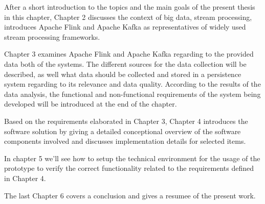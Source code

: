 After a short introduction to the topics and the main goals of the present thesis in this
chapter, Chapter 2 discusses the context of big data, stream processing, introduces Apache Flink and
Apache Kafka as representatives of widely used stream processing frameworks.

Chapter 3 examines Apache Flink and Apache Kafka regarding to the provided data both of the systems.
The different sources for the data collection will be described, as well what data should be collected
and stored in a persistence system regarding to its relevance and data quality. According to the results
of the data analysis, the functional and non-functional requirements of the system being developed will
be introduced at the end of the chapter.

Based on the requirements elaborated in Chapter 3, Chapter 4 introduces the software solution by
giving a detailed conceptional overview of the software components involved and discusses implementation
details for selected items.

In chapter 5 we'll see how to setup the technical environment for the usage of the prototype
to verify the correct functionality related to the requirements defined in Chapter 4.

The last Chapter 6 covers a conclusion and gives a resumee of the present work.
